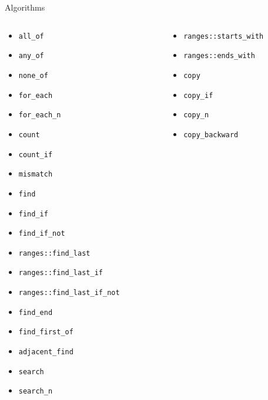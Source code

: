 \documentclass[aspectratio=169]{beamer}
\begin{document}
\begin{frame}{Algorithms}
  \pause
  \tiny
  \begin{columns}
    \begin{column}{.33\textwidth}
      \begin{itemize}
        \item{\texttt{all_of}}
        \item{\texttt{any_of}}
        \item{\texttt{none_of}}
        \item{\texttt{for_each}}
        \item{\texttt{for_each_n}}
        \item{\texttt{count}}
        \item{\texttt{count_if}}
        \item{\texttt{mismatch}}
        \item{\texttt{find}}
        \item{\texttt{find_if}}
        \item{\texttt{find_if_not}}
        \item{\texttt{ranges::find_last}}
        \item{\texttt{ranges::find_last_if}}
        \item{\texttt{ranges::find_last_if_not}}
        \item{\texttt{find_end}}
        \item{\texttt{find_first_of}}
        \item{\texttt{adjacent_find}}
        \item{\texttt{search}}
        \item{\texttt{search_n}}
      \end{itemize}
    \end{column}
    \begin{column}{.33\textwidth}
      \begin{itemize}
        \item{\texttt{ranges::starts_with}}
        \item{\texttt{ranges::ends_with}}
        \item{\texttt{copy}}
        \item{\texttt{copy_if}}
        \item{\texttt{copy_n}}
        \item{\texttt{copy_backward}}

\end{itemize}
\end{column}
\end{columns}
\end{frame}
\end{document}
